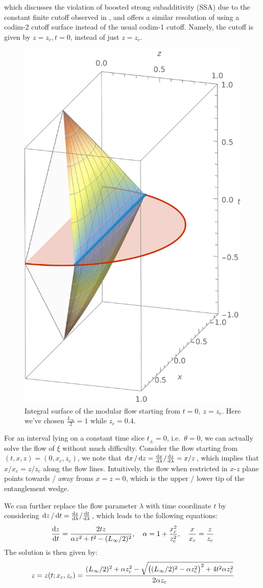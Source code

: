 \documentclass[11pt,a4paper]{article}
\begin{document}
	 which discusses the violation of boosted strong subadditivity (SSA) due to the constant finite cutoff observed in \cite{Lewkowycz:2019xse}, and offers a similar resolution of using a codim-2 cutoff surface instead of the usual codim-1 cutoff. Namely, the cutoff is given by $
		z = z_c, t = 0
	$, instead of just $z = z_c$. 
	
	\begin{figure}[!ht]
	\centering
	\includegraphics[width=.35\linewidth]{img/modFlowAnalytic.pdf}
	\caption{Integral surface of the modular flow starting from $t = 0,\ z = z_c$. Here we've chosen $\frac{L_\infty}{2} = 1$ while $z_c = 0.4$.}
	\end{figure}
	
\pagebreak
	
	For an interval lying on a constant time slice $t_\pm = 0$, i.e.~$\theta = 0$, we can actually solve the flow of $\xi$ without much difficulty.
	Consider the flow starting from $(t,x,z) = (0,x_c,z_c)$, we note that $
		\dd{x}/\dd{z}
		= {\dv{x}{\lambda}}/{\dv{z}{\lambda}}
		= {x}/{z}
	$, which implies that ${x}/{x_c} = {z}/{z_c}$ along the flow lines. Intuitively, the flow when restricted in $x$-$z$ plane points towards / away froms $x = z = 0$, which is the upper / lower tip of the entanglement wedge. 
	
	We can further replace the flow parameter $\lambda$ with time coordinate $t$ by considering $
		\dd{z}/\dd{t}
		= {\dv{z}{\lambda}}/{\dv{t}{\lambda}}
	$, which leads to the following equations:
	\begin{equation}
		\dv{z}{t}
		= \frac{2tz}{\alpha z^2 + t^2 - (L_\infty/2)^2},
	\quad
		\alpha = 1 + \frac{x_c^2}{z_c^2},
	\quad
		\frac{x}{x_c} = \frac{z}{z_c}
	\end{equation}
	The solution is then given by:
	\begin{equation}
		z = z(t;x_c,z_c)
		= \frac{
				(L_\infty/2)^2 + \alpha z_c^2
				- \sqrt{
					\pqty\big{(L_\infty/2)^2 - \alpha z_c^2}^2
					+ 4t^2 \alpha z_c^2
				}
			}{2\alpha z_c}
	\end{equation}
	
\end{document}
